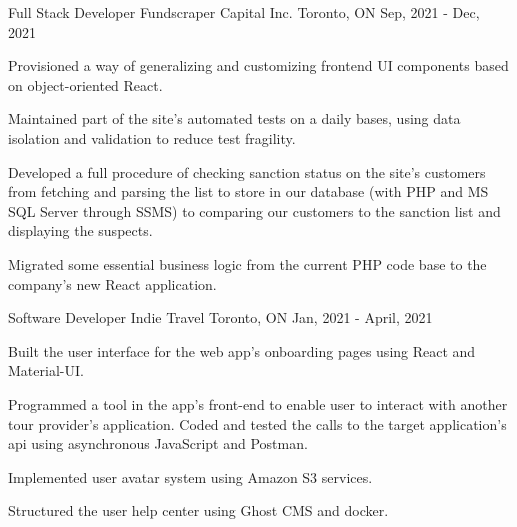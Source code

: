 

\begin{cventries}

  \cventry
    {Full Stack Developer} %
    {Fundscraper Capital Inc.} %
    {Toronto, ON} %
    {Sep, 2021 - Dec, 2021} %
    {
      \begin{cvitems} %
        \item {Provisioned a way of generalizing and customizing frontend UI components based on object-oriented React.}
        \item {Maintained part of the site's automated tests on a daily bases, using data isolation and validation to reduce test fragility.}
        \item {Developed a full procedure of checking sanction status on the site's customers from fetching and parsing the list to store in our database (with PHP and MS SQL Server through SSMS) to comparing our customers to the sanction list and displaying the suspects.}
        \item {Migrated some essential business logic from the current PHP code base to the company's new React application.}
      \end{cvitems}
    }
  \cventry
	{Software Developer} %
	{Indie Travel} %
	{Toronto, ON} %
	{Jan, 2021 - April, 2021} %
	{
		\begin{cvitems} %
			\item {Built the user interface for the web app’s onboarding pages using React and Material-UI.}
			\item {Programmed a tool in the app's front-end to enable user to interact with another tour provider's application. Coded and tested the  calls to the target application's api using asynchronous JavaScript and Postman.}
			\item {Implemented user avatar system using Amazon S3 services.}
			\item {Structured the user help center using Ghost CMS and docker.}
		\end{cvitems}
	}

\end{cventries}
